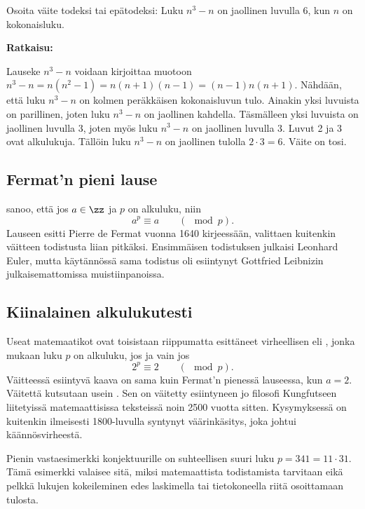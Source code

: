\begin{esimerkki}
Osoita väite todeksi tai epätodeksi: Luku $n^3 - n$ on jaollinen luvulla $6$, kun $n$ on
kokonaisluku.


{\bf Ratkaisu:}

Lauseke $n^3 - n$ voidaan kirjoittaa muotoon $n^3 - n = n(n^2
- 1) = n(n + 1)(n - 1) = (n - 1)n(n + 1)$. Nähdään, että luku
$n^3 - n$ on kolmen peräkkäisen kokonaisluvun tulo. Ainakin
yksi luvuista on parillinen, joten luku $n^3 - n$ on jaollinen
kahdella. Täsmälleen yksi luvuista on jaollinen luvulla $3$,
joten myös luku $n^3 - n$ on jaollinen luvulla $3$. Luvut 2 ja
3 ovat alkulukuja. Tällöin luku $n^3 - n$ on jaollinen tulolla
$2 \cdot 3 = 6$. Väite on tosi.
\end{esimerkki}

\subsection*{Fermat'n pieni lause}  sanoo, että jos $a\in\zz$ ja $p$ on alkuluku, niin 
\[
a^p \equiv a \qquad (\mod p).
\]
Lauseen esitti Pierre de Fermat vuonna 1640 kirjeessään, valittaen kuitenkin väitteen todistusta liian pitkäksi. Ensimmäisen todistuksen julkaisi Leonhard Euler, mutta käytännössä sama todistus oli esiintynyt Gottfried Leibnizin julkaisemattomissa muistiinpanoissa.

\subsection*{Kiinalainen alkulukutesti}
Useat matemaatikot ovat toisistaan riippumatta esittäneet virheellisen  eli , jonka mukaan luku $p$ on alkuluku, jos ja vain jos
\[
2^p \equiv 2 \qquad (\mod p).
\]
Väitteessä esiintyvä kaava on sama kuin Fermat'n pienessä lauseessa, kun $a=2$. Väitettä kutsutaan usein . Sen on väitetty esiintyneen jo filosofi Kungfutseen liitetyissä matemaattisissa teksteissä noin 2500 vuotta sitten. Kysymyksessä on kuitenkin ilmeisesti 1800-luvulla syntynyt väärinkäsitys, joka johtui  kään\-nös\-vir\-hees\-tä.

Pienin vastaesimerkki konjektuurille on suhteellisen suuri luku $p=341 = 11\cdot 31$. Tämä esimerkki valaisee sitä, miksi matemaattista todistamista tarvitaan eikä pelkkä lukujen kokeileminen edes laskimella tai tietokoneella riitä osoittamaan tulosta.


